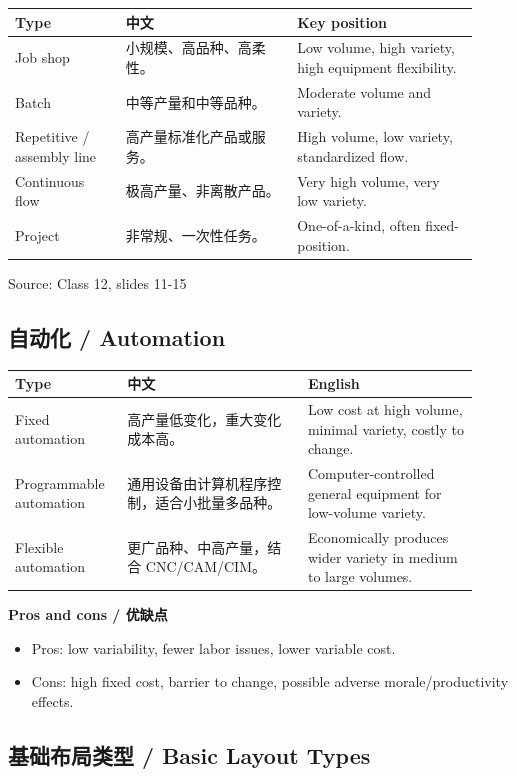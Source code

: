 \documentclass[10pt,a4paper]{ctexart}
\newcommand{\source}[1]{\textcolor{Muted}{\footnotesize Source: #1}}
\begin{document}
\begin{longtable}{@{}L{0.22\linewidth}L{0.34\linewidth}L{0.36\linewidth}@{}}
\toprule
\textbf{Type} & \textbf{中文} & \textbf{Key position} \\
\midrule
Job shop & 小规模、高品种、高柔性。 & Low volume, high variety, high equipment flexibility. \\
Batch & 中等产量和中等品种。 & Moderate volume and variety. \\
Repetitive / assembly line & 高产量标准化产品或服务。 & High volume, low variety, standardized flow. \\
Continuous flow & 极高产量、非离散产品。 & Very high volume, very low variety. \\
Project & 非常规、一次性任务。 & One-of-a-kind, often fixed-position. \\
\bottomrule
\end{longtable}
\source{Class 12, slides 11-15}

\subsection{自动化 / Automation}
\begin{longtable}{@{}L{0.22\linewidth}L{0.36\linewidth}L{0.34\linewidth}@{}}
\toprule
\textbf{Type} & \textbf{中文} & \textbf{English} \\
\midrule
Fixed automation & 高产量低变化，重大变化成本高。 & Low cost at high volume, minimal variety, costly to change. \\
Programmable automation & 通用设备由计算机程序控制，适合小批量多品种。 & Computer-controlled general equipment for low-volume variety. \\
Flexible automation & 更广品种、中高产量，结合 CNC/CAM/CIM。 & Economically produces wider variety in medium to large volumes. \\
\bottomrule
\end{longtable}

\textbf{Pros and cons / 优缺点}
\begin{itemize}
  \item Pros: low variability, fewer labor issues, lower variable cost.
  \item Cons: high fixed cost, barrier to change, possible adverse morale/productivity effects.
\end{itemize}

\subsection{基础布局类型 / Basic Layout Types}
\label{subsec:layouts}
\end{document}
